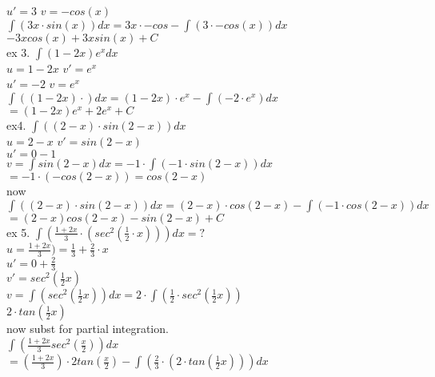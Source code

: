 \documentclass{article}
\begin{document}
  $u'=3 $ $v=-cos(x)$\\
  $\int(3x\cdot sin(x))dx=3x\cdot -cos-\int(3\cdot -cos(x))dx$\\
  $-3xcos(x)+3x sin(x)+C$\\
  ex 3. $\int(1-2x)e^xdx$\\
  $u=1-2x$ $v'=e^x$\\
  $u'=-2$ $v=e^x$\\
  $\int((1-2x)\cdot)dx=(1-2x)\cdot e^x-\int(-2\cdot e^x)dx$\\
  $=(1-2x)e^x+2e^x+C$\\
  ex4. $\int((2-x)\cdot sin(2-x))dx$\\
  $u=2-x$ $v'=sin(2-x)$\\
  $u'=0-1$\\
  $v=\int sin(2-x)dx=-1\cdot\int(-1\cdot sin(2-x))dx$\\
  $=-1\cdot (-cos(2-x))=cos(2-x)$\\
  now $\int((2-x)\cdot sin(2-x))dx=(2-x)\cdot cos(2-x)-\int(-1\cdot cos(2-x))dx$\\
  $=(2-x)cos(2-x)-sin(2-x)+C$\\
  ex 5. $\int (\frac{1+2x}{3}\cdot (sec^2(\frac{1}{2}\cdot x)))dx=?$\\
  $u=\frac{1+2x}{3})=\frac{1}{3}+\frac{2}{3}\cdot x$\\
  $u'=0+\frac{2}{3}$\\
  $v'=sec^2(\frac{1}{2}x)$\\
  $v=\int(sec^2(\frac{1}{2}x))dx=2\cdot \int (\frac{1}{2}\cdot sec^2(\frac{1}{2}x))$\\
  $2\cdot tan(\frac{1}{2}x)$\\
  now subst for partial integration.\\
  $\int (\frac{1+2x}{3}sec^2(\frac{x}{2}))dx$\\
  $=(\frac{1+2x}{3})\cdot 2tan(\frac{x}{2})-\int(\frac{2}{3}\cdot (2\cdot tan(\frac{1}{2}x)))dx$\\
  
  
   
\end{document}
